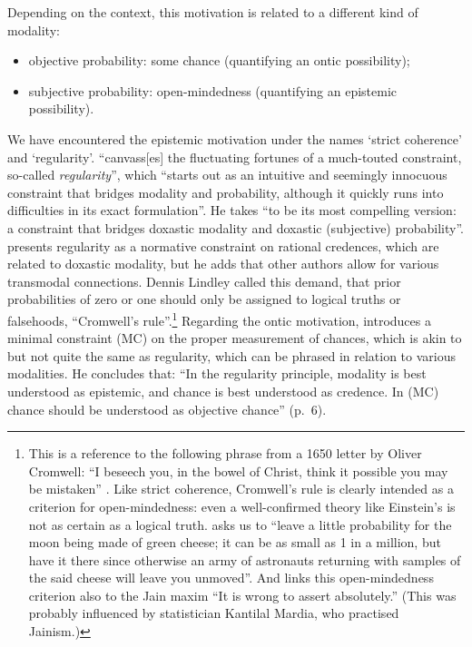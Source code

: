 Depending on the context, this motivation is related to a different kind of modality:
\begin{itemize}
  \item objective probability: some chance (quantifying an ontic possibility);
  \item subjective probability: open-mindedness (quantifying an epistemic possibility).
\end{itemize}
We have encountered the epistemic motivation under the names `strict coherence' and `regularity'.
\citet[p.~1 of draft]{Hajek:2012b} ``canvass[es] the fluctuating fortunes of a much-touted constraint, so-called \emph{regularity}'', which ``starts out as an intuitive and seemingly innocuous constraint that bridges modality and probability, although it quickly runs into difficulties in its exact formulation''. He takes ``to be its most compelling version: a constraint that bridges doxastic modality and doxastic (subjective) probability''.
\citet{Easwaran:2014} presents regularity as a normative constraint on rational credences, which are related to doxastic modality, but he adds that other authors allow for various transmodal connections.
Dennis Lindley called this demand, that prior probabilities of zero or one should only be assigned to logical truths or falsehoods, ``Cromwell's rule''.\footnote{This is a reference to the following phrase from a 1650 letter by Oliver Cromwell: ``I beseech you, in the bowel of Christ, think it possible you may be mistaken'' \citet[reprinted in][]{Carlyle:1845}. Like strict coherence, Cromwell's rule is clearly intended as a criterion for open-mindedness: even a well-confirmed theory like Einstein's is not as certain as a logical truth. \citet[p.~104]{Lindley:1991} asks us to ``leave a little probability for the moon being made of green cheese; it can be as small as 1 in a million, but have it there since otherwise an army of astronauts returning with samples of the said cheese will leave you unmoved''. And \citet[p.~91]{Lindley:2006} links this open-mindedness criterion also to the Jain maxim ``It is wrong to assert absolutely.'' (This was probably influenced by statistician Kantilal Mardia, who practised Jainism.)}
Regarding the ontic motivation, \citet{Hofweber:2014} introduces a minimal constraint (MC) on the proper measurement of chances, which is akin to but not quite the same as regularity, which can be phrased in relation to various modalities. He concludes that: ``In the regularity principle, modality is best understood as epistemic, and chance is best understood as credence. In (MC) chance should be understood as objective chance'' (p.~6).

